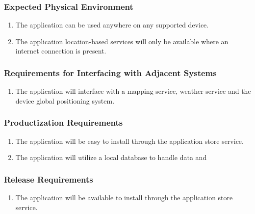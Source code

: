 \documentclass[titlepage]{article}
\begin{document}
\subsubsection{Expected Physical Environment}
\label{ssub:expected_physical_environment}
\begin{enumerate}[{OE}1. ]
	\item The application can be used anywhere on any supported device.
    \item The application location-based services will only be available where an internet
    connection
    is present.
\end{enumerate}

\subsubsection{Requirements for Interfacing with Adjacent Systems}
\label{ssub:requirements_for_interfacing_with_adjacent_systems}
\begin{enumerate}[{OE}1. ]
    \item The application will interface with a mapping service, weather service and the device
    global positioning system.
\end{enumerate}

\subsubsection{Productization Requirements}
\label{ssub:productization_requirements}
\begin{enumerate}[{OE}1. ]
	\item The application will be easy to install through the application store service.
	\item The application will utilize a local database to handle data and 
\end{enumerate}

\subsubsection{Release Requirements}
\label{ssub:release_requirements}
\begin{enumerate}[{OE}1. ]
	\item The application will be available to install through the application store service.
\end{enumerate}
\end{document}
